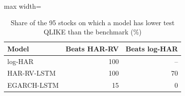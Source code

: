 \begin{table}[H]
\centering
\caption{Share of the 95 stocks on which a model has lower test QLIKE than the benchmark (\%)}
\label{tab:winrates}
\small
\begin{adjustbox}{max width=\textwidth}
\begin{tabular}{lrr}
\toprule
Model & Beats HAR-RV & Beats log-HAR \\
\midrule
log-HAR & 100 & -- \\
HAR-RV-LSTM & 100 & 70 \\
EGARCH-LSTM & 15 & 0 \\
\bottomrule
\end{tabular}
\end{adjustbox}
\end{table}
